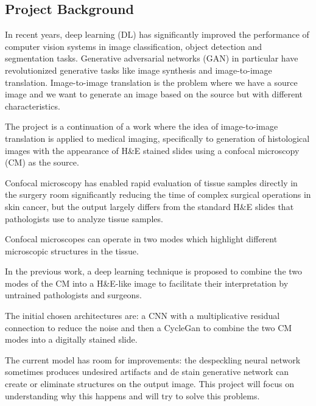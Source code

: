 \documentclass[../main.tex]{subfiles}
\begin{document}
\subsection{Project Background}
\label{sec:project-background}

In recent years, deep learning (DL) has significantly improved the
performance of computer vision systems in image classification, object
detection and segmentation tasks. Generative adversarial networks (GAN)
in particular have revolutionized generative tasks like image synthesis
and image-to-image translation. Image-to-image translation is the
problem where we have a source image and we want to generate an image
based on the source but with different characteristics.

The project is a continuation of a work \cite{Combalia2019} where the idea of
image-to-image translation is applied to medical imaging, specifically
to generation of histological images with the appearance of H\&E stained
slides using a confocal microscopy (CM) as the source.

Confocal microscopy has enabled rapid evaluation of tissue samples
directly in the surgery room significantly reducing the time of complex
surgical operations in skin cancer, but the output largely differs from
the standard H\&E slides that pathologists use to analyze tissue
samples.

Confocal microscopes can operate in two modes which highlight different
microscopic structures in the tissue.

In the previous work, a deep learning technique is proposed to combine
the two modes of the CM into a H\&E-like image to facilitate their
interpretation by untrained pathologists and surgeons.

The initial chosen architectures are: a CNN with a multiplicative
residual connection to reduce the noise and then a CycleGan to combine
the two CM modes into a digitally stained slide.

The current model has room for improvements: the despeckling neural
network sometimes produces undesired artifacts and de stain generative
network can create or eliminate structures on the output image. This
project will focus on understanding why this happens and will try to
solve this problems.

\printbibliography
\end{document}
